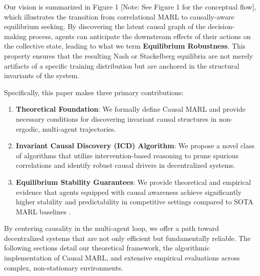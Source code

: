 Our vision is summarized in Figure 1 [Note: See Figure 1 for the conceptual flow], which illustrates the transition from correlational MARL to causally-aware equilibrium seeking. By discovering the latent causal graph of the decision-making process, agents can anticipate the downstream effects of their actions on the collective state, leading to what we term \textbf{Equilibrium Robustness}. This property ensures that the resulting Nash or Stackelberg equilibria are not merely artifacts of a specific training distribution but are anchored in the structural invariants of the system.

Specifically, this paper makes three primary contributions:
\begin{enumerate}
    \item \textbf{Theoretical Foundation}: We formally define Causal MARL and provide necessary conditions for discovering invariant causal structures in non-ergodic, multi-agent trajectories.
    \item \textbf{Invariant Causal Discovery (ICD) Algorithm}: We propose a novel class of algorithms that utilize intervention-based reasoning to prune spurious correlations and identify robust causal drivers in decentralized systems.
    \item \textbf{Equilibrium Stability Guarantees}: We provide theoretical and empirical evidence that agents equipped with causal awareness achieve significantly higher stability and predictability in competitive settings compared to SOTA MARL baselines \cite{yu2022surprising, gao2024causal}.
\end{enumerate}

By centering causality in the multi-agent loop, we offer a path toward decentralized systems that are not only efficient but fundamentally reliable. The following sections detail our theoretical framework, the algorithmic implementation of Causal MARL, and extensive empirical evaluations across complex, non-stationary environments.